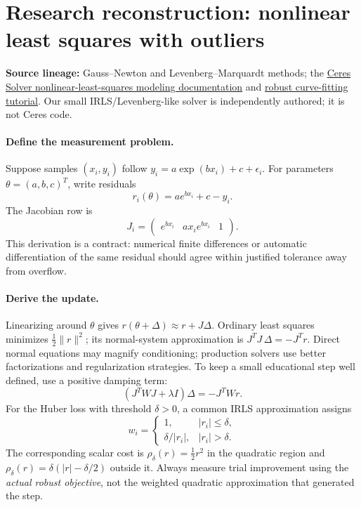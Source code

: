 \clearpage
\section*{Research reconstruction: nonlinear least squares with outliers}
\noindent\textbf{Source lineage:} Gauss--Newton and
Levenberg--Marquardt methods; the
\href{https://ceres-solver.readthedocs.io/latest/nnls_modeling.html}
{Ceres Solver nonlinear-least-squares modeling documentation}
and \href{https://ceres-solver.readthedocs.io/latest/tutorial.html}
{robust curve-fitting tutorial}. Our small IRLS/Levenberg-like
solver is independently authored; it is not Ceres code.

\paragraph{Define the measurement problem.}
Suppose samples \((x_i,y_i)\) follow
\(y_i=a\exp(bx_i)+c+\epsilon_i\). For parameters
\(\theta=(a,b,c)^T\), write residuals
\[
r_i(\theta)=a e^{bx_i}+c-y_i.
\]
The Jacobian row is
\[
J_i=\begin{pmatrix}
e^{bx_i}&a x_i e^{bx_i}&1
\end{pmatrix}.
\]
This derivation is a contract: numerical finite differences
or automatic differentiation of the same residual should
agree within justified tolerance away from overflow.

\paragraph{Derive the update.}
Linearizing around \(\theta\) gives
\(r(\theta+\Delta)\approx r+J\Delta\).
Ordinary least squares minimizes \(\frac12\lVert r\rVert^2\);
its normal-system approximation is
\(J^TJ\,\Delta=-J^Tr\).
Direct normal equations may magnify conditioning; production
solvers use better factorizations and regularization strategies.
To keep a small educational step well defined, use a positive
damping term:
\[
(J^TWJ+\lambda I)\Delta=-J^TWr.
\]
For the Huber loss with threshold \(\delta>0\), a common
IRLS approximation assigns
\[
w_i=\begin{cases}
1,&|r_i|\le\delta,\\
\delta/|r_i|,&|r_i|>\delta.
\end{cases}
\]
The corresponding scalar cost is
\(\rho_\delta(r)=\frac12r^2\) in the quadratic region and
\(\rho_\delta(r)=\delta(|r|-\delta/2)\) outside it.
Always measure trial improvement using the \emph{actual robust
objective}, not the weighted quadratic approximation that
generated the step.

